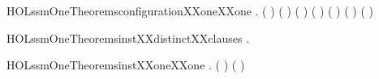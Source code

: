 \begin{SaveVerbatim}{HOLssmOneTheoremsconfigurationXXoneXXone}
\HOLTokenTurnstile{} \HOLSymConst{\HOLTokenForall{}}           .
     (       \HOLSymConst{=}       ) \HOLSymConst{\HOLTokenEquiv{}}
     ( \HOLSymConst{=} ) \HOLSymConst{\HOLTokenConj{}} ( \HOLSymConst{=} ) \HOLSymConst{\HOLTokenConj{}} ( \HOLSymConst{=} ) \HOLSymConst{\HOLTokenConj{}} ( \HOLSymConst{=} ) \HOLSymConst{\HOLTokenConj{}}
     ( \HOLSymConst{=} ) \HOLSymConst{\HOLTokenConj{}} ( \HOLSymConst{=} )
\end{SaveVerbatim}
\newcommand{\HOLssmOneTheoremsconfigurationXXoneXXone}{\UseVerbatim{HOLssmOneTheoremsconfigurationXXoneXXone}}
\begin{SaveVerbatim}{HOLssmOneTheoremsinstXXdistinctXXclauses}
\HOLTokenTurnstile{} \HOLSymConst{\HOLTokenForall{}}.   \HOLSymConst{\HOLTokenNotEqual{}} 
\end{SaveVerbatim}
\newcommand{\HOLssmOneTheoremsinstXXdistinctXXclauses}{\UseVerbatim{HOLssmOneTheoremsinstXXdistinctXXclauses}}
\begin{SaveVerbatim}{HOLssmOneTheoremsinstXXoneXXone}
\HOLTokenTurnstile{} \HOLSymConst{\HOLTokenForall{}} . (  \HOLSymConst{=}  ) \HOLSymConst{\HOLTokenEquiv{}} ( \HOLSymConst{=} )
\end{SaveVerbatim}
